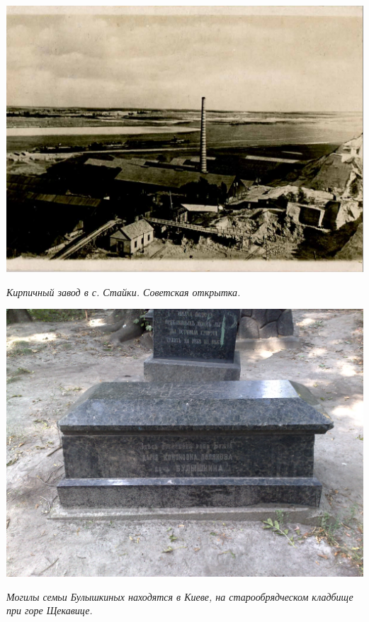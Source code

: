 \begin{center}
\includegraphics[width=0.95\linewidth]{pix/staiki.png}

\textit{Кирпичный завод в с. Стайки. Советская открытка.}
\end{center} 


\begin{center}
\includegraphics[width=0.95\linewidth]{pix/27082009561.jpg}

\textit{Могилы семьи Булышкиных находятся в Киеве, на старообрядческом кладбище при горе Щекавице.}
\end{center} 
